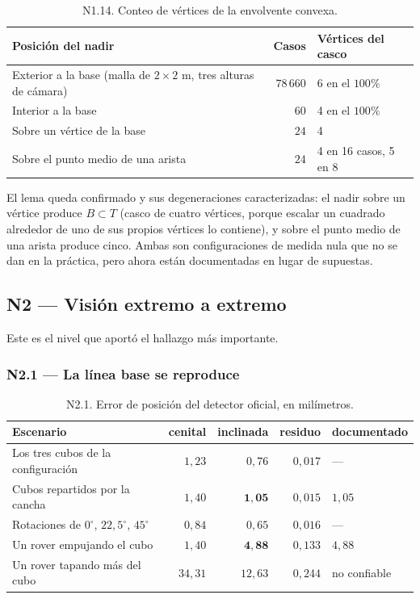 \documentclass[11pt,a4paper]{article}
\newcommand{\grados}{^{\circ}}
\begin{document}
\begin{table}[htbp]
\centering
\small
\caption{N1.14. Conteo de vértices de la envolvente convexa.}
\begin{tabular}{lrl}
\toprule
Posición del nadir & Casos & Vértices del casco \\
\midrule
Exterior a la base (malla de $2\times2$ m, tres alturas de cámara) & $78\,660$ & 6 en el $100\%$ \\
Interior a la base & $60$ & 4 en el $100\%$ \\
Sobre un vértice de la base & $24$ & 4 \\
Sobre el punto medio de una arista & $24$ & 4 en 16 casos, 5 en 8 \\
\bottomrule
\end{tabular}
\end{table}

El lema queda confirmado y sus degeneraciones caracterizadas: el nadir sobre un vértice
produce $B \subset T$ (casco de cuatro vértices, porque escalar un cuadrado alrededor de
uno de sus propios vértices lo contiene), y sobre el punto medio de una arista produce
cinco. Ambas son configuraciones de medida nula que no se dan en la práctica, pero ahora
están documentadas en lugar de supuestas.

\subsection{N2 --- Visión extremo a extremo}

Este es el nivel que aportó el hallazgo más importante.

\subsubsection{N2.1 --- La línea base se reproduce}

\begin{table}[htbp]
\centering
\small
\caption{N2.1. Error de posición del detector oficial, en milímetros.}
\begin{tabular}{lrrrl}
\toprule
Escenario & cenital & inclinada & residuo & documentado \\
\midrule
Los tres cubos de la configuración & $1{,}23$ & $0{,}76$ & $0{,}017$ & --- \\
Cubos repartidos por la cancha & $1{,}40$ & $\mathbf{1{,}05}$ & $0{,}015$ & $1{,}05$ \\
Rotaciones de $0\grados$, $22{,}5\grados$, $45\grados$ & $0{,}84$ & $0{,}65$ & $0{,}016$ & --- \\
Un rover empujando el cubo & $1{,}40$ & $\mathbf{4{,}88}$ & $0{,}133$ & $4{,}88$ \\
Un rover tapando más del cubo & $34{,}31$ & $12{,}63$ & $0{,}244$ & no confiable \\
\bottomrule
\end{tabular}
\end{table}
\end{document}
